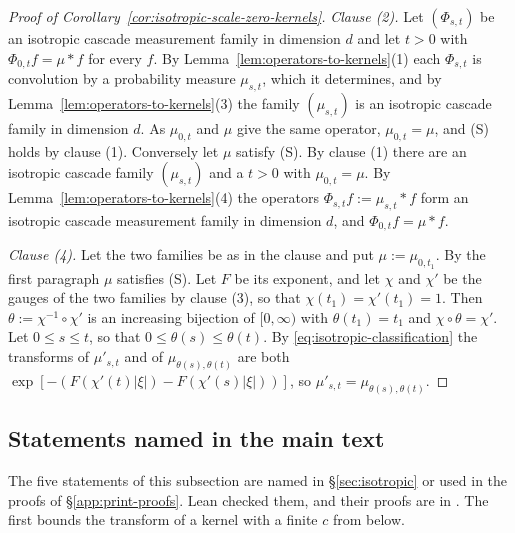 \begin{proof}[Proof of Corollary~\ref{cor:isotropic-scale-zero-kernels}]
\emph{Clause (2).} Let $(\Phi_{s,t})$ be an isotropic cascade measurement family in dimension
$d$ and let $t > 0$ with $\Phi_{0,t}f = \mu * f$ for every $f$. By
Lemma~\ref{lem:operators-to-kernels}(1) each $\Phi_{s,t}$ is convolution by a probability measure
$\mu_{s,t}$, which it determines, and by Lemma~\ref{lem:operators-to-kernels}(3) the family
$(\mu_{s,t})$ is an isotropic cascade family in dimension $d$. As $\mu_{0,t}$ and $\mu$ give the
same operator, $\mu_{0,t} = \mu$, and (S) holds by clause (1). Conversely let $\mu$ satisfy (S).
By clause (1) there are an isotropic cascade family $(\mu_{s,t})$ and a $t > 0$ with
$\mu_{0,t} = \mu$. By Lemma~\ref{lem:operators-to-kernels}(4) the operators
$\Phi_{s,t}f := \mu_{s,t} * f$ form an isotropic cascade measurement family in dimension $d$,
and $\Phi_{0,t}f = \mu * f$.

\emph{Clause (4).} Let the two families be as in the clause and put $\mu := \mu_{0,t_1}$. By
the first paragraph $\mu$ satisfies (S). Let $F$ be its exponent, and let $\chi$ and $\chi'$ be
the gauges of the two families by clause (3), so that $\chi(t_1) = \chi'(t_1) = 1$. Then
$\theta := \chi^{-1} \circ \chi'$ is an increasing bijection of $[0,\infty)$ with
$\theta(t_1) = t_1$ and $\chi \circ \theta = \chi'$. Let $0 \le s \le t$, so that
$0 \le \theta(s) \le \theta(t)$. By \ref{eq:isotropic-classification} the transforms of
$\mu'_{s,t}$ and of $\mu_{\theta(s),\theta(t)}$ are both
$\exp[-(F(\chi'(t)|\xi|) - F(\chi'(s)|\xi|))]$, so $\mu'_{s,t} = \mu_{\theta(s),\theta(t)}$.
\end{proof}

\subsection{Statements named in the main text}\label{app:further-statements}

The five statements of this subsection are named in \S\ref{sec:isotropic} or used in the proofs
of \S\ref{app:print-proofs}. Lean checked them, and their proofs are in \suppl. The first
bounds the transform of a kernel with a finite $c$ from below.

